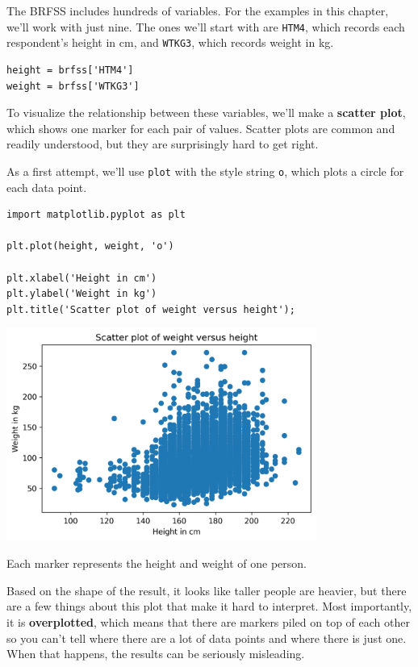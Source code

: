The BRFSS includes hundreds of variables. For the examples in this
chapter, we'll work with just nine. The ones we'll start with are
\passthrough{\lstinline!HTM4!}, which records each respondent's height
in cm, and \passthrough{\lstinline!WTKG3!}, which records weight in kg.

\begin{lstlisting}[]
height = brfss['HTM4']
weight = brfss['WTKG3']
\end{lstlisting}

To visualize the relationship between these variables, we'll make a
\textbf{scatter plot}, which shows one marker for each pair of values.
Scatter plots are common and readily understood, but they are
surprisingly hard to get right.

As a first attempt, we'll use \passthrough{\lstinline!plot!} with the
style string \passthrough{\lstinline!o!}, which plots a circle for each
data point.

\begin{lstlisting}[]
import matplotlib.pyplot as plt

plt.plot(height, weight, 'o')

plt.xlabel('Height in cm')
plt.ylabel('Weight in kg')
plt.title('Scatter plot of weight versus height');
\end{lstlisting}

\begin{center}
\includegraphics[width=4in]{chapters/09_relationships_files/09_relationships_12_0.png}
\end{center}

Each marker represents the height and weight of one person.

Based on the shape of the result, it looks like taller people are
heavier, but there are a few things about this plot that make it hard to
interpret. Most importantly, it is \textbf{overplotted}, which means
that there are markers piled on top of each other so you can't tell
where there are a lot of data points and where there is just one. When
that happens, the results can be seriously misleading.

